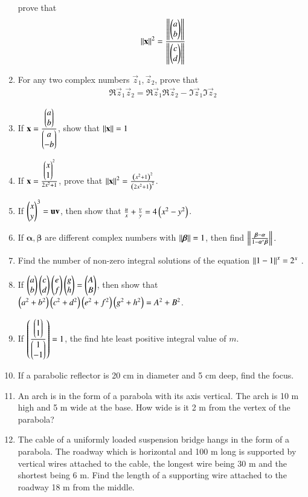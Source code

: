 \begin{enumerate}[label=\arabic*.,ref=\thesubsection.\theenumi]
prove that 
%
\begin{align}
\left\lVert\mathbf{x}\right\rVert^2 = \frac{
\left\lVert
\begin{pmatrix}a\\b\end{pmatrix}
\right\rVert
}
{
\left\lVert\begin{pmatrix}c\\d\end{pmatrix}\right\rVert
}
\end{align}
\item For any two complex numbers $\vec{z}_1, \vec{z}_2$, prove that 
%
\begin{align}
\Re{\vec{z}_1\vec{z}_2} = 
\Re{\vec{z}_1}
\Re{\vec{z}_2}-
\Im{\vec{z}_1}
\Im{\vec{z}_2}
\end{align}
\item If $\mathbf{x} = \frac{\begin{pmatrix}a\\b\end{pmatrix}}{\begin{pmatrix}a\\-b\end{pmatrix}}$, show that $\mathbf{\left\lVert x\right\rVert} = 1$
%
\item If $\mathbf{x} = \frac{\begin{pmatrix}x\\1\end{pmatrix}^2}{2x^2+1}$, prove that $\left\lVert\mathbf{x}\right\rVert^2 = \frac{\left(x^2+1\right)^2}{\left(2x^2+1\right)^2}$.
%
\item If $\begin{pmatrix}x\\y\end{pmatrix}^3 = \mathbf{u\\v}$, then show that $\frac{u}{x}+\frac{v}{y} = 4\left(x^2-y^2\right)$.
\item If $\bm{\alpha}, \bm{\beta}$ are different complex numbers with $\left\lVert\bm{\beta}\right\rVert=1$, then find $\left\lVert\frac{\bm{\beta}-\bm{\alpha}}{1-\bm{\alpha}^{*}\bm{\beta}}\right\rVert.$
\item Find the number of non-zero integral solutions of the equation $\left\lVert1\\-1\right\rVert^x = 2^x$ .
\item If $\begin{pmatrix} a\\ b\end{pmatrix}\begin{pmatrix}c \\ d\end{pmatrix}\begin{pmatrix}e \\ f\end{pmatrix}\begin{pmatrix}g \\ h\end{pmatrix} = \begin{pmatrix}A \\ B\end{pmatrix}$, then show that 
$\left(a^2+b^2\right)\left(c^2+d^2\right)\left(e^2+f^2\right)\left(g^2+h^2\right)=A^2+B^2$.
\item If $\left(\frac{\begin{pmatrix}1\\1\end{pmatrix}}{\begin{pmatrix}1\\-1\end{pmatrix}}\right)=1$,  the find hte least positive integral value of $m$.
\item If a parabolic reflector is 20 cm in diameter and 5 cm deep, find the focus. 
\item An arch is in the form of a parabola with its axis vertical. The arch is 10 m high and 5 m wide at the base. How wide is it 2 m from the vertex of the parabola?
\item The cable of a uniformly loaded suspension bridge hangs in the form of a parabola. The roadway which is horizontal and 100 m long is supported by vertical wires attached to the cable, the longest wire being 30 m and the shortest being 6 m. Find the length of a supporting wire attached to the roadway 18 m from the middle.

\end{enumerate}
